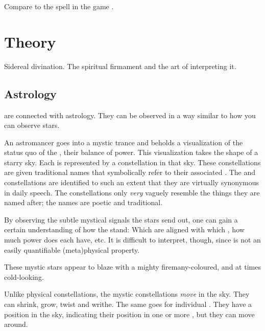 Compare to the spell  in the game \cite{VideoGame:DiabloII}. 















\section{\Matrix Theory}
Sidereal divination. 
The spiritual firmament and the art of interpreting it. 







\subsection{Astrology}
\Matrices{} are connected with {astrology}. 
They can be observed in a way similar to how you can observe stars. 

An astromancer goes into a mystic trance and beholds a visualization of the status quo of the \nexuses, their balance of power. 
This visualization takes the shape of a starry sky. 
Each \nexus{} is represented by a constellation in that sky. 
These constellations are given traditional names that symbolically refer to their associated \nexus. 
The \nexuses{} and constellations are identified to such an extent that they are virtually synonymous in daily speech. 
The constellations only \emph{very} vaguely resemble the things they are named after; the names are poetic and traditional. 

By observing the subtle mystical signals the stars send out, one can gain a certain understanding of how the \nexuses{} stand: 
Which \vertices{} are aligned with which \nexuses, how much power does each \nexus{} have, etc. 
It is difficult to interpret, though, since  is not an easily quantifiable (meta)physical property. 

These mystic stars appear to blaze with a mighty fire\dash many-coloured, and at times cold-looking.

Unlike physical constellations, the mystic constellations \emph{move} in the sky. 
They can shrink, grow, twist and writhe. 
The same goes for individual \vertices.
They have a position in the sky, indicating their position in one or more \nexuses, but they can move around.  

